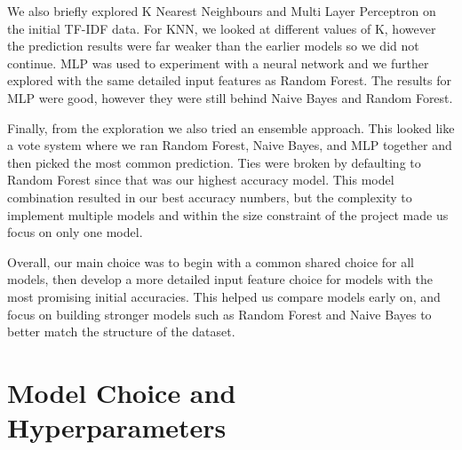 \documentclass[12pt]{article}
\begin{document}
We also briefly explored K Nearest Neighbours and Multi Layer Perceptron on the initial TF-IDF data. For KNN, we looked at different values of K, however the prediction results were far weaker than the earlier models so we did not continue. MLP was used to experiment with a neural network and we further explored with the same detailed input features as Random Forest. The results for MLP were good, however they were still behind Naive Bayes and Random Forest.

Finally, from the exploration we also tried an ensemble approach. This looked like a vote system where we ran Random Forest, Naive Bayes, and MLP together and then picked the most common prediction. Ties were broken by defaulting to Random Forest since that was our highest accuracy model. This model combination resulted in our best accuracy numbers, but the complexity to implement multiple models and within the size constraint of the project made us focus on only one model.

Overall, our main choice was to begin with a common shared choice for all models, then develop a more detailed input feature choice for models with the most promising initial accuracies. This helped us compare models early on, and focus on building stronger models such as Random Forest and Naive Bayes to better match the structure of the dataset.

\newpage


\section{Model Choice and Hyperparameters}
\end{document}
